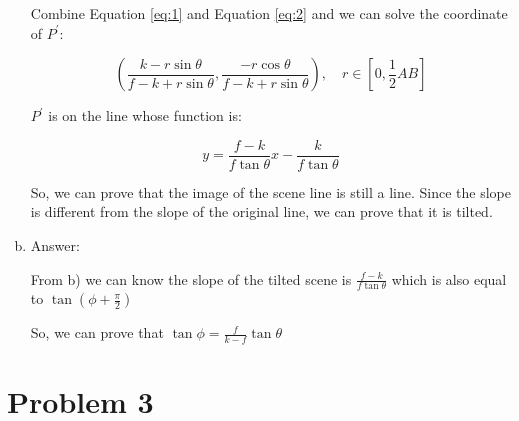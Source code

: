 \documentclass{homework}
\begin{document}
\begin{enumerate}[a)]
	Combine Equation \ref{eq:1} and Equation \ref{eq:2} and we can solve the coordinate of $P^{'}$:
	
	$$(\frac{k-r\sin\theta}{f-k+r\sin\theta}, \frac{-r\cos\theta}{f-k+r\sin\theta}), \quad r\in[0,\frac{1}{2}AB]  $$
	
	$P^{'}$ is on the line whose function is:
	
	$$y=\frac{f-k}{f\tan\theta}x-\frac{k}{f\tan\theta}$$
	
	So, we can prove that the image of the scene line is still a line. Since the slope is different from the slope of the original line, we can prove that it is tilted.
	
	\item Answer:
	
	From b) we can know the slope of the tilted scene is $\frac{f-k}{f\tan\theta}$ which is also equal to $\tan(\phi+\frac{\pi}{2})$
	
	So, we can prove that $\tan\phi = \frac{f}{k-f}\tan\theta$

\end{enumerate}

\section{Problem 3}
\end{document}
